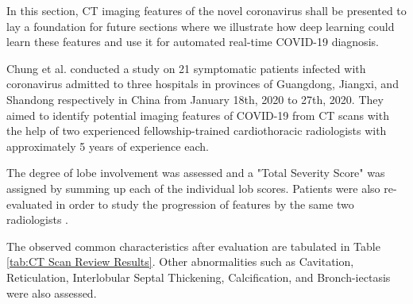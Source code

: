 In this section, CT imaging features of the novel coronavirus 
shall be presented to lay a foundation for future sections 
where we illustrate how deep learning could learn these features 
and use it for automated real-time COVID-19 diagnosis.

Chung et al. conducted a study on 21 symptomatic patients infected with coronavirus admitted to three hospitals in provinces of Guangdong, Jiangxi, and Shandong respectively in China from January 18th, 2020 to 27th, 2020. They aimed to identify potential imaging features of COVID-19 from CT scans with the help of two experienced fellowship-trained cardiothoracic radiologists with approximately 5 years of experience each.


The degree of lobe involvement was 
assessed and a "Total Severity Score" was assigned by summing up each of the 
individual lob scores. Patients were also re-evaluated in order to study the 
progression of features by the same two radiologists \cite{CMA+2020}.

The observed common characteristics after evaluation are tabulated in Table \ref{tab:CT Scan Review Results}. Other abnormalities such as Cavitation, Reticulation, Interlobular Septal Thickening, Calcification, and Bronch-iectasis were also assessed.
\vspace{1em}

